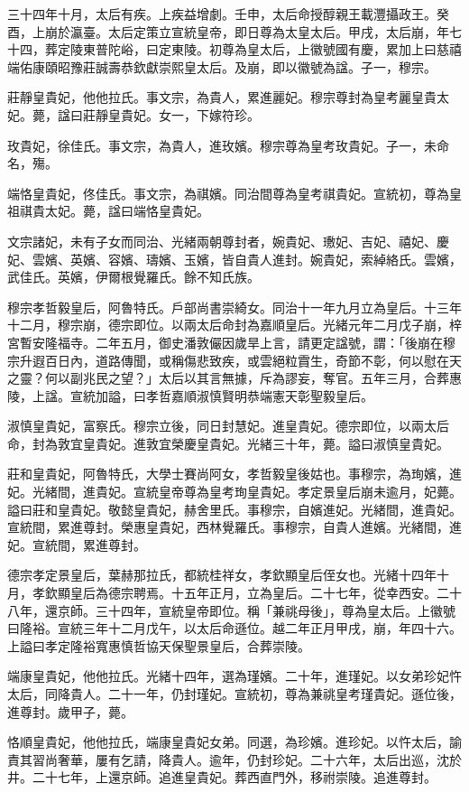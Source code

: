 \begin{pinyinscope}
三十四年十月，太后有疾。上疾益增劇。壬申，太后命授醇親王載灃攝政王。癸酉，上崩於瀛臺。太后定策立宣統皇帝，即日尊為太皇太后。甲戌，太后崩，年七十四，葬定陵東普陀峪，曰定東陵。初尊為皇太后，上徽號國有慶，累加上曰慈禧端佑康頤昭豫莊誠壽恭欽獻崇熙皇太后。及崩，即以徽號為諡。子一，穆宗。

莊靜皇貴妃，他他拉氏。事文宗，為貴人，累進麗妃。穆宗尊封為皇考麗皇貴太妃。薨，諡曰莊靜皇貴妃。女一，下嫁符珍。

玫貴妃，徐佳氏。事文宗，為貴人，進玫嬪。穆宗尊為皇考玫貴妃。子一，未命名，殤。

端恪皇貴妃，佟佳氏。事文宗，為祺嬪。同治間尊為皇考祺貴妃。宣統初，尊為皇祖祺貴太妃。薨，諡曰端恪皇貴妃。

文宗諸妃，未有子女而同治、光緒兩朝尊封者，婉貴妃、璷妃、吉妃、禧妃、慶妃、雲嬪、英嬪、容嬪、璹嬪、玉嬪，皆自貴人進封。婉貴妃，索綽絡氏。雲嬪，武佳氏。英嬪，伊爾根覺羅氏。餘不知氏族。

穆宗孝哲毅皇后，阿魯特氏。戶部尚書崇綺女。同治十一年九月立為皇后。十三年十二月，穆宗崩，德宗即位。以兩太后命封為嘉順皇后。光緒元年二月戊子崩，梓宮暫安隆福寺。二年五月，御史潘敦儼因歲旱上言，請更定諡號，謂：「後崩在穆宗升遐百日內，道路傳聞，或稱傷悲致疾，或雲絕粒霣生，奇節不彰，何以慰在天之靈？何以副兆民之望？」太后以其言無據，斥為謬妄，奪官。五年三月，合葬惠陵，上諡。宣統加謚，曰孝哲嘉順淑慎賢明恭端憲天彰聖毅皇后。

淑慎皇貴妃，富察氏。穆宗立後，同日封慧妃。進皇貴妃。德宗即位，以兩太后命，封為敦宜皇貴妃。進敦宜榮慶皇貴妃。光緒三十年，薨。謚曰淑慎皇貴妃。

莊和皇貴妃，阿魯特氏，大學士賽尚阿女，孝哲毅皇後姑也。事穆宗，為珣嬪，進妃。光緒間，進貴妃。宣統皇帝尊為皇考珣皇貴妃。孝定景皇后崩未逾月，妃薨。謚曰莊和皇貴妃。敬懿皇貴妃，赫舍里氏。事穆宗，自嬪進妃。光緒間，進貴妃。宣統間，累進尊封。榮惠皇貴妃，西林覺羅氏。事穆宗，自貴人進嬪。光緒間，進妃。宣統間，累進尊封。

德宗孝定景皇后，葉赫那拉氏，都統桂祥女，孝欽顯皇后侄女也。光緒十四年十月，孝欽顯皇后為德宗聘焉。十五年正月，立為皇后。二十七年，從幸西安。二十八年，還京師。三十四年，宣統皇帝即位。稱「兼祧母後」，尊為皇太后。上徽號曰隆裕。宣統三年十二月戊午，以太后命遜位。越二年正月甲戌，崩，年四十六。上謚曰孝定隆裕寬惠慎哲協天保聖景皇后，合葬崇陵。

端康皇貴妃，他他拉氏。光緒十四年，選為瑾嬪。二十年，進瑾妃。以女弟珍妃忤太后，同降貴人。二十一年，仍封瑾妃。宣統初，尊為兼祧皇考瑾貴妃。遜位後，進尊封。歲甲子，薨。

恪順皇貴妃，他他拉氏，端康皇貴妃女弟。同選，為珍嬪。進珍妃。以忤太后，諭責其習尚奢華，屢有乞請，降貴人。逾年，仍封珍妃。二十六年，太后出巡，沈於井。二十七年，上還京師。追進皇貴妃。葬西直門外，移祔崇陵。追進尊封。


\end{pinyinscope}
